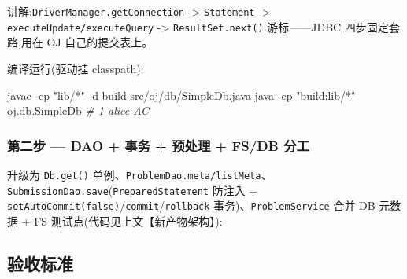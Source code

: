 \documentclass[
  11pt,
]{ctexart}
\newenvironment{Shaded}{\begin{snugshade}}{\end{snugshade}}
\newcommand{\AttributeTok}[1]{\textcolor[rgb]{0.13,0.29,0.53}{#1}}
\newcommand{\CommentTok}[1]{\textcolor[rgb]{0.56,0.35,0.01}{\textit{#1}}}
\newcommand{\ExtensionTok}[1]{#1}
\newcommand{\FunctionTok}[1]{\textcolor[rgb]{0.13,0.29,0.53}{\textbf{#1}}}
\newcommand{\NormalTok}[1]{#1}
\newcommand{\StringTok}[1]{\textcolor[rgb]{0.31,0.60,0.02}{#1}}
\newcommand{\VariableTok}[1]{\textcolor[rgb]{0.00,0.00,0.00}{#1}}
\begin{document}
讲解:\texttt{DriverManager.getConnection} -\textgreater{}
\texttt{Statement} -\textgreater{} \texttt{executeUpdate/executeQuery}
-\textgreater{} \texttt{ResultSet.next()} 游标------JDBC
四步固定套路,用在 OJ 自己的提交表上。

编译运行(驱动挂 classpath):

\begin{Shaded}
\begin{Highlighting}[]
\ExtensionTok{javac} \AttributeTok{{-}cp} \StringTok{"lib/*"} \AttributeTok{{-}d}\NormalTok{ build src/oj/db/SimpleDb.java}
\ExtensionTok{java} \AttributeTok{{-}cp} \StringTok{"build:lib/*"}\NormalTok{ oj.db.SimpleDb}
\CommentTok{\# 1 alice AC}
\end{Highlighting}
\end{Shaded}

\hypertarget{ux7b2cux4e8cux6b65-dao-ux4e8bux52a1-ux9884ux5904ux7406-fsdb-ux5206ux5de5}{%
\subsubsection{\texorpdfstring{第二步 \GC --- DAO + 事务 + 预处理 +
FS/DB
分工}{第二步 --- DAO + 事务 + 预处理 + FS/DB 分工}}\label{ux7b2cux4e8cux6b65-dao-ux4e8bux52a1-ux9884ux5904ux7406-fsdb-ux5206ux5de5}}

升级为 \texttt{Db.get()}
单例、\texttt{ProblemDao.meta/listMeta}、\texttt{SubmissionDao.save}(\texttt{PreparedStatement}
防注入 + \texttt{setAutoCommit(false)}/\texttt{commit}/\texttt{rollback}
事务)、\texttt{ProblemService} 合并 DB 元数据 + FS
测试点(代码见上文【新产物架构】):

\begin{Shaded}
\end{Shaded}

\hypertarget{ux9a8cux6536ux6807ux51c6-6}{%
\subsection{验收标准}\label{ux9a8cux6536ux6807ux51c6-6}}
\end{document}
